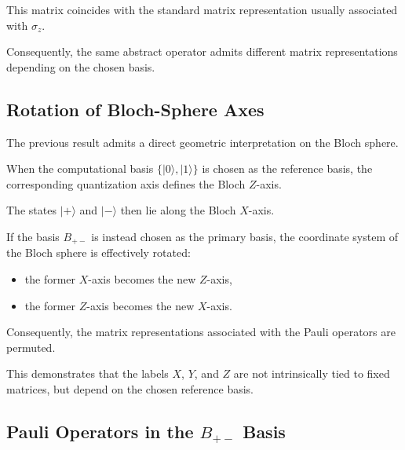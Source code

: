 This matrix coincides with the standard matrix representation usually associated with \( \sigma_z \).

\medskip

Consequently, the same abstract operator admits different matrix representations depending on the chosen basis.


\subsection*{Rotation of Bloch-Sphere Axes}

The previous result admits a direct geometric interpretation on the Bloch sphere.

When the computational basis \( \{|0\rangle,|1\rangle\} \) is chosen as the reference basis, the corresponding quantization axis defines the Bloch \(Z\)-axis.

The states \( |+\rangle \) and \( |-\rangle \) then lie along the Bloch \(X\)-axis.

\medskip

If the basis \( B_{+-} \) is instead chosen as the primary basis, the coordinate system of the Bloch sphere is effectively rotated:

\begin{itemize}

\item the former \(X\)-axis becomes the new \(Z\)-axis,

\item the former \(Z\)-axis becomes the new \(X\)-axis.

\end{itemize}

Consequently, the matrix representations associated with the Pauli operators are permuted.

\medskip

This demonstrates that the labels \(X\), \(Y\), and \(Z\) are not intrinsically tied to fixed matrices, but depend on the chosen reference basis.


\subsection*{Pauli Operators in the \(B_{+-}\) Basis}

